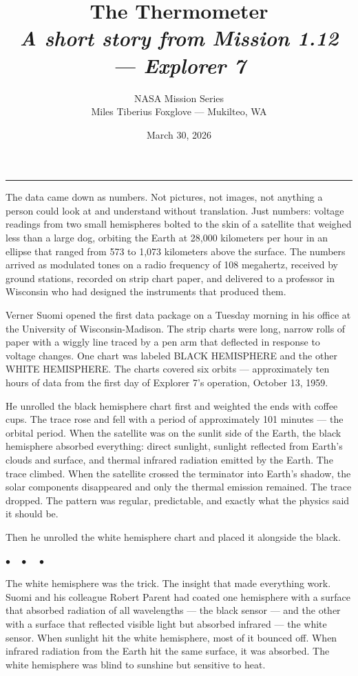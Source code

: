 \documentclass[12pt, letterpaper]{article}
\title{\Huge\textbf{The Thermometer}\\[0.5em]\large\textit{A short story from Mission 1.12 --- Explorer 7}}
\author{NASA Mission Series\\[0.3em]\small Miles Tiberius Foxglove --- Mukilteo, WA}
\date{March 30, 2026}
\begin{document}
\maketitle
\thispagestyle{empty}

\vspace{1em}
\noindent\rule{\textwidth}{0.4pt}
\vspace{1em}

\noindent The data came down as numbers. Not pictures, not images, not anything a person could look at and understand without translation. Just numbers: voltage readings from two small hemispheres bolted to the skin of a satellite that weighed less than a large dog, orbiting the Earth at 28,000 kilometers per hour in an ellipse that ranged from 573 to 1,073 kilometers above the surface. The numbers arrived as modulated tones on a radio frequency of 108 megahertz, received by ground stations, recorded on strip chart paper, and delivered to a professor in Wisconsin who had designed the instruments that produced them.

Verner Suomi opened the first data package on a Tuesday morning in his office at the University of Wisconsin-Madison. The strip charts were long, narrow rolls of paper with a wiggly line traced by a pen arm that deflected in response to voltage changes. One chart was labeled BLACK HEMISPHERE and the other WHITE HEMISPHERE. The charts covered six orbits --- approximately ten hours of data from the first day of Explorer 7's operation, October 13, 1959.

He unrolled the black hemisphere chart first and weighted the ends with coffee cups. The trace rose and fell with a period of approximately 101 minutes --- the orbital period. When the satellite was on the sunlit side of the Earth, the black hemisphere absorbed everything: direct sunlight, sunlight reflected from Earth's clouds and surface, and thermal infrared radiation emitted by the Earth. The trace climbed. When the satellite crossed the terminator into Earth's shadow, the solar components disappeared and only the thermal emission remained. The trace dropped. The pattern was regular, predictable, and exactly what the physics said it should be.

Then he unrolled the white hemisphere chart and placed it alongside the black.

\begin{center}
$\bullet\quad\bullet\quad\bullet$
\end{center}

The white hemisphere was the trick. The insight that made everything work. Suomi and his colleague Robert Parent had coated one hemisphere with a surface that absorbed radiation of all wavelengths --- the black sensor --- and the other with a surface that reflected visible light but absorbed infrared --- the white sensor. When sunlight hit the white hemisphere, most of it bounced off. When infrared radiation from the Earth hit the same surface, it was absorbed. The white hemisphere was blind to sunshine but sensitive to heat.
\end{document}
